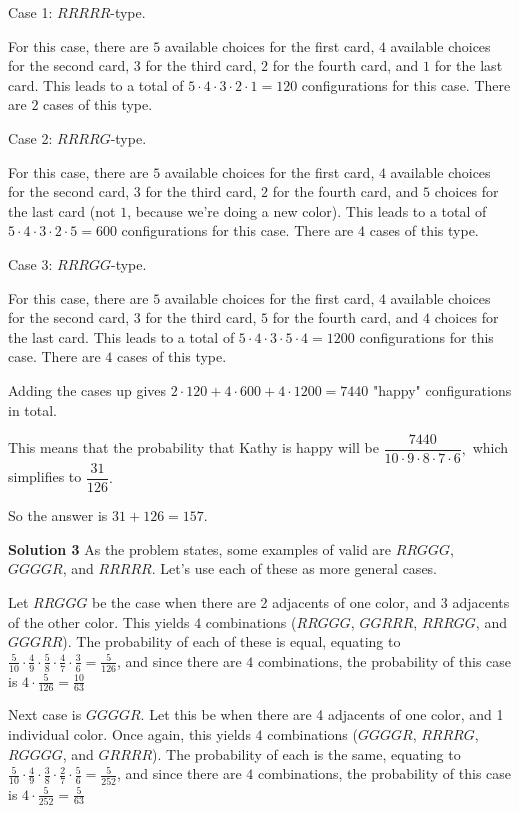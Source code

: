 \documentclass[a4paper,11pt]{article}
\begin{document}
Case 1: $RRRRR$-type.

For this case, there are $5$ available choices for the first card, $4$ available choices for the second card, $3$ for the third card, $2$ for the fourth card, and $1$ for the last card. This leads to a total of $5\cdot 4\cdot 3\cdot 2\cdot 1=120$ configurations for this case. There are $2$ cases of this type.

Case 2: $RRRRG$-type.

For this case, there are $5$ available choices for the first card, $4$ available choices for the second card, $3$ for the third card, $2$ for the fourth card, and $5$ choices for the last card (not $1$, because we're doing a new color). This leads to a total of $5\cdot 4\cdot 3\cdot 2\cdot 5=600$ configurations for this case. There are $4$ cases of this type.

Case 3: $RRRGG$-type.

For this case, there are $5$ available choices for the first card, $4$ available choices for the second card, $3$ for the third card, $5$ for the fourth card, and $4$ choices for the last card. This leads to a total of $5\cdot 4\cdot 3\cdot 5\cdot 4=1200$ configurations for this case. There are $4$ cases of this type.

Adding the cases up gives $2\cdot 120+4\cdot 600+4\cdot 1200=7440$ "happy" configurations in total.

This means that the probability that Kathy is happy will be $\dfrac{7440}{10\cdot 9\cdot 8\cdot 7\cdot 6},$ which simplifies to $\dfrac{31}{126}.$

So the answer is $31+126=\boxed{157.}$

\textbf{Solution 3}
As the problem states, some examples of valid are $RRGGG$, $GGGGR$, and $RRRRR$. Let's use each of these as more general cases.

Let $RRGGG$ be the case when there are 2 adjacents of one color, and 3 adjacents of the other color. This yields $4$ combinations ($RRGGG$, $GGRRR$, $RRRGG$, and $GGGRR$). The probability of each of these is equal, equating to $\frac{5}{10}\cdot \frac{4}{9}\cdot \frac{5}{8}\cdot \frac{4}{7}\cdot \frac{3}{6}=\frac{5}{126}$, and since there are $4$ combinations, the probability of this case is $4\cdot \frac{5}{126}=\frac{10}{63}$

Next case is $GGGGR$. Let this be when there are 4 adjacents of one color, and 1 individual color. Once again, this yields $4$ combinations ($GGGGR$, $RRRRG$, $RGGGG$, and $GRRRR$). The probability of each is the same, equating to $\frac{5}{10}\cdot \frac{4}{9}\cdot \frac{3}{8}\cdot \frac{2}{7}\cdot \frac{5}{6}=\frac{5}{252}$, and since there are $4$ combinations, the probability of this case is $4\cdot \frac{5}{252}=\frac{5}{63}$
\end{document}
